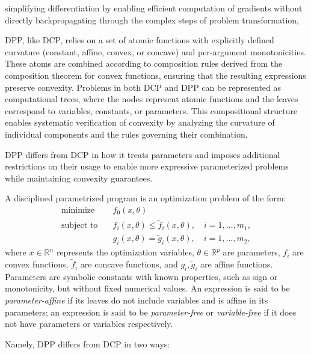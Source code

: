 \documentclass{article}
\begin{document}
simplifying differentiation by enabling efficient computation of gradients without directly backpropagating through the complex steps of problem transformation,

DPP, like DCP, relies on a set of atomic functions with explicitly defined curvature (constant, affine, convex, or concave) and per-argument monotonicities. These atoms are combined according to composition rules derived from the composition theorem for convex functions, ensuring that the resulting expressions preserve convexity. Problems in both DCP and DPP can be represented as computational trees, where the nodes represent atomic functions and the leaves correspond to variables, constants, or parameters. This compositional structure enables systematic verification of convexity by analyzing the curvature of individual components and the rules governing their combination.

DPP differs from DCP in how it treats parameters and imposes additional restrictions on their usage to enable more expressive parameterized problems while maintaining convexity guarantees. 

A disciplined parametrized program is an optimization problem of the form:
\[
\begin{aligned}
\text{minimize} \quad & f_0(x, \theta) \\
\text{subject to} \quad & f_i(x, \theta) \leq \tilde{f}_i(x, \theta), \quad i = 1, \ldots, m_1, \\
& g_i(x, \theta) = \tilde{g}_i(x, \theta), \quad i = 1, \ldots, m_2,
\end{aligned}
\]
where \( x \in \mathbb{R}^n \) represents the optimization variables, \( \theta \in \mathbb{R}^p \) are parameters, \( f_i \) are convex functions, \( \tilde{f}_i \) are concave functions, and \( g_i, \tilde{g}_i \) are affine functions. Parameters are symbolic constants with known properties, such as sign or monotonicity, but without fixed numerical values. An expression is said to be \textit{parameter-affine} if its leaves do not include variables and is affine in its parameters; an expression is said to be \textit{parameter-free} or \textit{variable-free} if it does not have parameters or variables respectively.

Namely, DPP differs from DCP in two ways:
\end{document}
